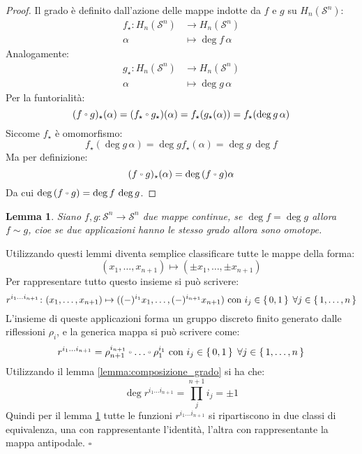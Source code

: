 \documentclass[10pt, toc=sectionentrywithdots]{scrartcl}
\newcounter{lemmac}
\newtheorem{lemma}[lemmac]{Lemma}
\newcommand{\Sph}[1][]{\mathcal{S}^#1}
\let\latexcirc=\circ
\newcommand{\ccirc}{\mathbin{\mathchoice
  {\xcirc\scriptstyle}
  {\xcirc\scriptstyle}
  {\xcirc\scriptscriptstyle}
  {\xcirc\scriptscriptstyle}
}}
\newcommand{\xcirc}[1]{\vcenter{\hbox{$#1\latexcirc$}}}
\let\circ\ccirc
\begin{document}
\begin{proof}
  Il grado è definito dall'azione delle mappe indotte da $ f $ e $ g $
  su $ H_n(\Sph{n}) $:
  \begin{align*}
    f_\star \colon H_n(\Sph{n}) & \to H_n(\Sph{n}) \\
    \alpha & \mapsto \deg f \, \alpha
  \end{align*}
  Analogamente:
  \begin{align*}
    g_\star \colon H_n(\Sph{n}) & \to H_n(\Sph{n}) \\
    \alpha & \mapsto \deg g \, \alpha
  \end{align*}
  Per la funtorialità:
  \[
    (f \circ g)_\star (\alpha) = (f_\star \circ g_\star)(\alpha) = f_\star(g_\star(\alpha)) = f_\star (\deg g \, \alpha)
  \]
  Siccome $ f_\star $ è omomorfismo:
  \[
    f_\star (\deg g \, \alpha) = \deg g f_\star (\alpha) = \deg g \, \deg f
  \]
  Ma per definizione:
  \[
    (f \circ g)_\star (\alpha) = \deg{(f \circ g)} \alpha
  \]
  Da cui $ \deg{(f \circ g)} = \deg f \, \deg g $.
\end{proof}
\begin{lemma}
  \label{lemma:hopf}
  Siano $ f,g \colon \Sph{n} \to \Sph{n} $ due mappe continue, se
  $ \deg f = \deg g $ allora $ f \sim g $, cioe se due applicazioni
  hanno le stesso grado allora sono omotope.
\end{lemma}
\noindent
Utilizzando questi lemmi diventa %
semplice classificare tutte le mappe della forma:
\[
  (x_1, \dots, x_{n+1}) \mapsto (\pm x_1, \dots, \pm x_{n+1})
\]
Per rappresentare tutto questo insieme si può scrivere:
\[
   r^{i_1\dots i_{n+1}} \colon (x_1, \dots, x_{n+1}) \mapsto ( (-)^{i_1} x_1, \dots, (-)^{i_{n+1}} x_{n+1}) \text{ con } i_j \in \set{0,1} \; \forall j \in \set{1,\dots, n}
\]
L'insieme di queste applicazioni forma un gruppo discreto finito
generato dalle riflessioni $ \rho_i $, e la generica mappa si può
scrivere come:
\[
  r^{i_1\dots i_{n+1}} = \rho_{n+1}^{i_{n+1}} \circ \dots \circ \rho_{1}^{i_{1}} \text{ con } i_j \in \set{0,1} \; \forall j \in \set{1,\dots, n}
\]
Utilizzando il lemma \ref{lemma:composizione_grado} si ha che:
\[
  \deg r^{i_1\dots i_{n+1}} = \prod_j^{n+1} i_{j} = \pm 1
\]
Quindi per il lemma \ref{lemma:hopf} tutte le funzioni $ r^{i_1\dots i_{n+1}} $ si
ripartiscono in due classi di equivalenza, una con rappresentante l'identità,
l'altra con rappresentante la mappa antipodale. \hfill $ \square $
\end{document}
